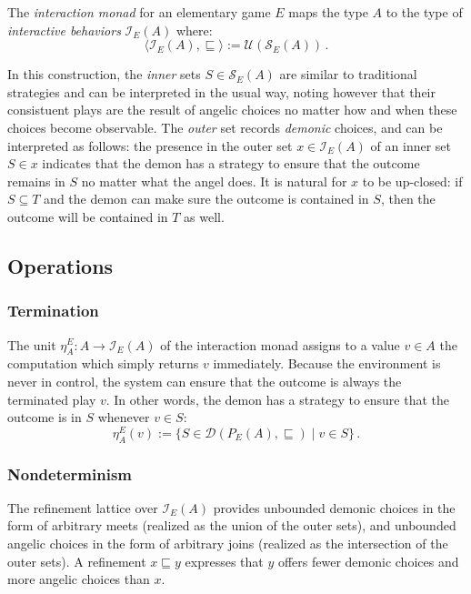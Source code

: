 \documentclass[format=sigplan,authordraft]{acmart}
\begin{document}
\begin{definition}
The \emph{interaction monad}
for an elementary game $E$
maps the type $A$ to the type of \emph{interactive behaviors}
$\mathcal{I}_E(A)$ where:
\[
  \langle \mathcal{I}_E(A), {\sqsubseteq} \rangle :=
    \mathcal{U}(\mathcal{S}_E(A)) \,.
\]
\end{definition}

In this construction,
the \emph{inner} sets $S \in \mathcal{S}_E(A)$
are similar to traditional strategies and
can be interpreted in the usual way,
noting however that their consistuent plays
are the result of angelic choices
no matter how and when these choices become observable.
The \emph{outer} set records \emph{demonic} choices,
and can be interpreted as follows:
the presence in the outer set $x \in \mathcal{I}_E(A)$
of an inner set $S \in x$
indicates that the demon has a strategy
to ensure that the outcome remains in $S$
no matter what the angel does.
It is natural for $x$ to be up-closed:
if $S \subseteq T$ and the demon can make sure
the outcome is contained in $S$,
then the outcome will be contained in $T$ as well.

\subsection{Operations}

\subsubsection{Termination}

The unit $\eta^E_A : A \rightarrow \mathcal{I}_E(A)$
of the interaction monad
assigns to a value $v \in A$ the computation
which simply returns $v$ immediately.
Because the environment is never in control,
the system can ensure that the outcome is always
the terminated play $v$.
In other words,
the demon has a strategy to ensure that the outcome is in $S$
whenever $v \in S$:
\[
  \eta^E_A(v) :=
    \{ S \in \mathcal{D}(P_E(A), {\sqsubseteq}) \mid v \in S \} \,.
\]

\subsubsection{Nondeterminism}

The refinement lattice over $\mathcal{I}_E(A)$
provides unbounded demonic choices
in the form of arbitrary meets
(realized as the union of the outer sets),
and unbounded angelic choices
in the form of arbitrary joins
(realized as the intersection of the outer sets).
A refinement $x \sqsubseteq y$ expresses that
$y$ offers fewer demonic choices and more angelic choices than $x$.
\end{document}
